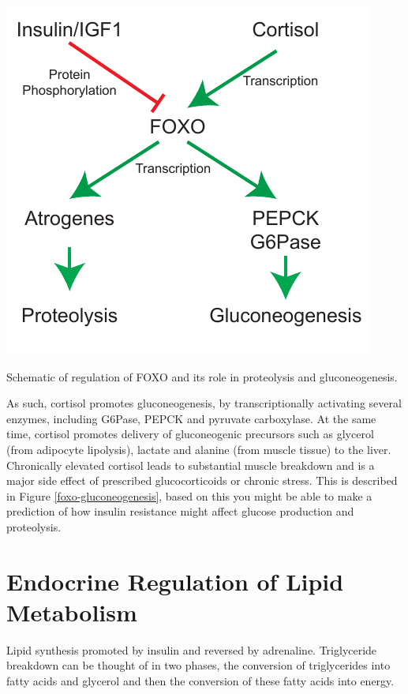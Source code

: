 \documentclass{tufte-handout}
\begin{document}
\begin{marginfigure}
\includegraphics{figures/foxo-gluconeogenesis}
\caption{Schematic of regulation of FOXO and its role in proteolysis and gluconeogenesis.}
\label{fig:foxo-gluconeogenesis}
\end{marginfigure}

  As such, cortisol promotes gluconeogenesis, by transcriptionally activating several enzymes, including G6Pase, PEPCK and pyruvate carboxylase.  At the same time, cortisol promotes delivery of gluconeogenic precursors such as glycerol (from adipocyte lipolysis), lactate and alanine (from muscle tissue) to the liver.  Chronically elevated cortisol leads to substantial muscle breakdown and is a major side effect of prescribed glucocorticoids or chronic stress.  This is described in Figure \ref{foxo-gluconeogenesis}, based on this you might be able to make a prediction of how insulin resistance might affect glucose production and proteolysis.

\section{Endocrine Regulation of Lipid Metabolism}

Lipid synthesis promoted by insulin and reversed by adrenaline.  Triglyceride breakdown can be thought of in two phases, the conversion of triglycerides into fatty acids and glycerol and then the conversion of these fatty acids into energy.
\end{document}
